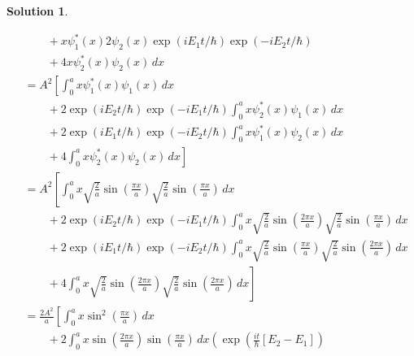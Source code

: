 \documentclass[10pt]{article}
\theoremstyle{definition}
\newtheorem{soln}{Solution}
\begin{document}
\begin{soln}
\begin{enumerate}[label=(\alph*)]
\begin{align*}
             & \qquad+x\psi_1^*(x)2\psi_2(x)\exp(iE_1t/\hbar)\exp(-iE_2t/\hbar)                                                                                                  \\
             & \qquad+4x\psi_2^*(x)\psi_2(x)\,dx                                                                                                                                 \\
             & =A^2\left[\int_{0}^{a}x\psi_1^*(x)\psi_1(x)\,dx\right.                                                                                                            \\
             & \qquad+2\exp(iE_2t/\hbar)\exp(-iE_1t/\hbar)\int_{0}^{a}x\psi_2^*(x)\psi_1(x)\,dx                                                                                  \\
             & \qquad+2\exp(iE_1t/\hbar)\exp(-iE_2t/\hbar)\int_{0}^{a}x\psi_1^*(x)\psi_2(x)\,dx                                                                                  \\
             & \qquad+\left.4\int_{0}^{a}x\psi_2^*(x)\psi_2(x)\,dx\right]                                                                                                        \\
             & =A^2\left[\int_{0}^{a}x\sqrt{\frac{2}{a}}\sin\left(\frac{\pi x}{a}\right)\sqrt{\frac{2}{a}}\sin\left(\frac{\pi x}{a}\right)\,dx\right.                            \\
             & \qquad+2\exp(iE_2t/\hbar)\exp(-iE_1t/\hbar)\int_{0}^{a}x\sqrt{\frac{2}{a}}\sin\left(\frac{2\pi x}{a}\right)\sqrt{\frac{2}{a}}\sin\left(\frac{\pi x}{a}\right)\,dx \\
             & \qquad+2\exp(iE_1t/\hbar)\exp(-iE_2t/\hbar)\int_{0}^{a}x\sqrt{\frac{2}{a}}\sin\left(\frac{\pi x}{a}\right)\sqrt{\frac{2}{a}}\sin\left(\frac{2\pi x}{a}\right)\,dx \\
             & \qquad+\left.4\int_{0}^{a}x\sqrt{\frac{2}{a}}\sin\left(\frac{2\pi x}{a}\right)\sqrt{\frac{2}{a}}\sin\left(\frac{2\pi x}{a}\right)\,dx\right]                      \\
             & =\frac{2A^2}{a}\left[\int_{0}^{a}x\sin^2\left(\frac{\pi x}{a}\right)\,dx\right.                                                                                   \\
             & \qquad+2\int_{0}^{a}x\sin\left(\frac{2\pi x}{a}\right)\sin\left(\frac{\pi x}{a}\right)\,dx\left(\exp(\frac{it}{\hbar}\left[E_2-E_1\right])\right.                 \\

\end{align*}
\end{enumerate}
\end{soln}
\end{document}
